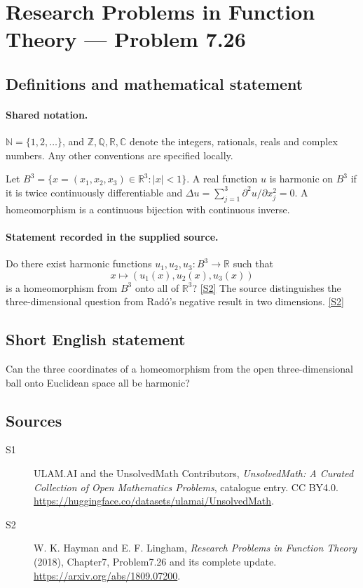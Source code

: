 \documentclass[11pt]{article}
\newcommand{\sref}[2]{\hyperlink{source:#1:#2}{[S#2]}}
\begin{document}
\section{Research Problems in Function Theory — Problem 7.26}\label{statement}

\subsection{Definitions and mathematical statement}

\paragraph{Shared notation.}$\mathbb N=\{1,2,\ldots\}$, and $\mathbb Z,\mathbb Q,\mathbb R,\mathbb C$ denote the integers, rationals, reals and complex numbers. Any other conventions are specified locally.


Let $B^3=\{x=(x_1,x_2,x_3)\in\mathbb R^3:|x|<1\}$. A real function $u$ is harmonic on $B^3$ if it is twice continuously differentiable and $\Delta u=\sum_{j=1}^3\partial^2u/\partial x_j^2=0$. A homeomorphism is a continuous bijection with continuous inverse.

\paragraph{Statement recorded in the supplied source.}
Do there exist harmonic functions $u_1,u_2,u_3:B^3\to\mathbb R$ such that
\[x\longmapsto (u_1(x),u_2(x),u_3(x))\]
is a homeomorphism from $B^3$ onto all of $\mathbb R^3$? \sref{statement}{2}
The source distinguishes the three-dimensional question from Radó's negative result in two dimensions. \sref{statement}{2}
\subsection{Short English statement}
Can the three coordinates of a homeomorphism from the open three-dimensional ball onto Euclidean space all be harmonic?
\subsection{Sources}
\begin{description}
\item[\hypertarget{source:statement:1}{S1}] ULAM.AI and the UnsolvedMath Contributors, \emph{UnsolvedMath: A Curated Collection of Open Mathematics Problems}, catalogue entry. CC BY4.0. \url{https://huggingface.co/datasets/ulamai/UnsolvedMath}.
\item[\hypertarget{source:statement:2}{S2}] W. K. Hayman and E. F. Lingham, \emph{Research Problems in Function Theory} (2018), Chapter7, Problem7.26 and its complete update. \url{https://arxiv.org/abs/1809.07200}.
\end{description}
\label{end:statement}
\end{document}
